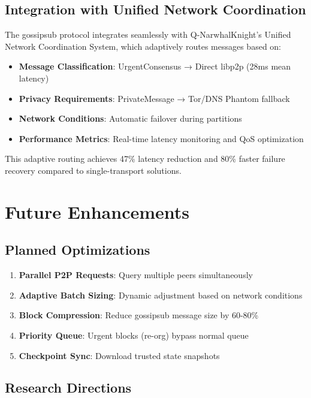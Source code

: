 \documentclass[11pt,a4paper]{article}
\begin{document}
\subsection{Integration with Unified Network Coordination}

The gossipsub protocol integrates seamlessly with Q-NarwhalKnight's Unified Network Coordination System, which adaptively routes messages based on:

\begin{itemize}
\item \textbf{Message Classification}: UrgentConsensus → Direct libp2p (28ms mean latency)
\item \textbf{Privacy Requirements}: PrivateMessage → Tor/DNS Phantom fallback
\item \textbf{Network Conditions}: Automatic failover during partitions
\item \textbf{Performance Metrics}: Real-time latency monitoring and QoS optimization
\end{itemize}

This adaptive routing achieves 47\% latency reduction and 80\% faster failure recovery compared to single-transport solutions.

\section{Future Enhancements}

\subsection{Planned Optimizations}

\begin{enumerate}
\item \textbf{Parallel P2P Requests}: Query multiple peers simultaneously
\item \textbf{Adaptive Batch Sizing}: Dynamic adjustment based on network conditions
\item \textbf{Block Compression}: Reduce gossipsub message size by 60-80\%
\item \textbf{Priority Queue}: Urgent blocks (re-org) bypass normal queue
\item \textbf{Checkpoint Sync}: Download trusted state snapshots
\end{enumerate}

\subsection{Research Directions}
\end{document}
